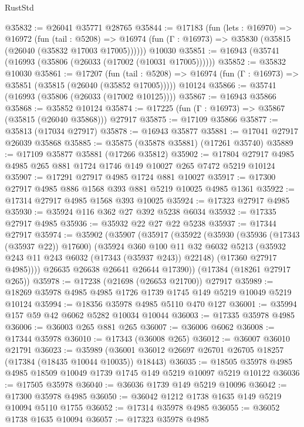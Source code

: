 \begin{lexlean}{RustStd}
\begin{coremodule}
@35832 := @26041 @35771 @28765
@35844 := @17183
    (fun (lets : @16970) =>
    @16972
      (fun (tail : @5208) =>
      @16974 (fun (Γ : @16973) => @35830 (@35815 (@26040 (@35832 @17003 @17005))))))
    @10030
@35851 := @16943 (@35741 (@16993 (@35806 (@26033 (@17002 (@10031 @17005))))))
@35852 := @35832 @10030
@35861 := @17207
    (fun (tail : @5208) => @16974 (fun (Γ : @16973) => @35851 (@35815 (@26040 (@35852 @17005)))))
    @10124
@35866 := @35741 (@16993 (@35806 (@26033 (@17002 @10125))))
@35867 := @16943 @35866
@35868 := @35852 @10124
@35874 := @17225 (fun (Γ : @16973) => @35867 (@35815 (@26040 @35868))) @27917
@35875 := @17109 @35866
@35877 := @35813 (@17034 @27917)
@35878 := @16943 @35877
@35881 := @17041 @27917 @26039 @35868
@35885 := @35875 (@35878 @35881) (@17261 @35740)
@35889 := @17109 @35877 @35881 (@17266 @35812)
@35902 := @17804 @27917 @4985 @4985 @265 @881 @1724 @1746 @149 @10027 @265 @7472 @5219 @10124
@35907 := @17291 @27917 @4985 @1724 @881 @10027
@35917 := @17300 @27917 @4985 @886 @1568 @393 @881 @5219 @10025 @4985 @1361
@35922 := @17314 @27917 @4985 @1568 @393 @10025
@35924 := @17323 @27917 @4985
@35930 := @35924 @116 @362 @27 @392 @5238 @6034
@35932 := @17335 @27917 @4985
@35936 := @35932 @22 @27 @22 @5238
@35937 := @17344 @27917
@35974 := @35902
    (@35907
      (@35917
        (@35922
          (@35930
            (@35936 (@17343 (@35937 @22)) @17600)
            (@35924
              @360
              @100
              @11
              @32
              @6032
              @5213
              (@35932 @243 @11 @243 @6032 (@17343 (@35937 @243)) @22148)
              (@17360 @27917 @4985))))
        @26635
        @26638
        @26641
        @26644
        @17390))
    (@17384 (@18261 @27917 @265))
@35978 := @17238 (@21698 (@26653 @21700)) @27917
@35989 := @18269 @35978 @4985 @4985 @1726 @1739 @1745 @149 @5219 @10049 @5219 @10124
@35994 := @18356 @35978 @4985 @5110 @470 @127
@36001 := @35994 @157 @59 @42 @6062 @5282 @10034 @10044
@36003 := @17335 @35978 @4985
@36006 := @36003 @265 @881 @265
@36007 := @36006 @6062
@36008 := @17344 @35978
@36010 := @17343 (@36008 @265)
@36012 := @36007 @36010 @21791
@36023 := @35989 (@36001 @36012 @26697 @26701 @26705 @18257 (@17384 (@18435 @10044 @10035)) @18443)
@36035 := @18505 @35978 @4985 @4985 @18509 @10049 @1739 @1745 @149 @5219 @10097 @5219 @10122
@36036 := @17505 @35978
@36040 := @36036 @1739 @149 @5219 @10096
@36042 := @17300 @35978 @4985
@36050 := @36042 @1212 @1738 @1635 @149 @5219 @10094 @5110 @1755
@36052 := @17314 @35978 @4985
@36055 := @36052 @1738 @1635 @10094
@36057 := @17323 @35978 @4985

\end{coremodule}
\end{lexlean}
